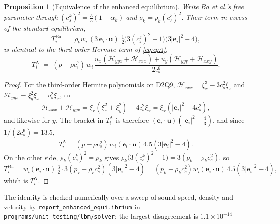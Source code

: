 \documentclass[11pt,a4paper]{article}
\theoremstyle{plain}
\newtheorem{proposition}{Proposition}
\theoremstyle{definition}
\newcommand{\ee}{\mathbf{e}}
\newcommand{\uu}{\mathbf{u}}
\newcommand{\cs}{c_s}
\begin{document}
\begin{proposition}[Equivalence of the enhanced equilibrium]
\label{prop:enhanced}
Write Ba et al.'s free parameter through
$(\cs^k)^2 = \tfrac{3}{5}(1-\alpha_k)$ and $p_k = \rho_k (\cs^k)^2$. Their term
in excess of the standard equilibrium,
\begin{equation}
  T^{\mathrm{Ba}}_i \;=\; \rho_k w_i \,(3\,\ee_i\!\cdot\!\uu)\;
  \tfrac12\bigl(3(\cs^k)^2 - 1\bigr)\bigl(3|\ee_i|^2 - 4\bigr),
\end{equation}
is identical to the third-order Hermite term of \eqref{eq:eqA},
\begin{equation}
  T^{\mathrm{A}}_i \;=\; (p - \rho\cs^2)\, w_i\,
  \frac{u_x(\mathcal{H}_{yyx} + \mathcal{H}_{xxx}) + u_y(\mathcal{H}_{yyy} + \mathcal{H}_{xxy})}{2\cs^6}.
\end{equation}
\end{proposition}

\begin{proof}
For the third-order Hermite polynomials on D2Q9,
$\mathcal{H}_{xxx} = \xi_x^3 - 3\cs^2 \xi_x$ and
$\mathcal{H}_{yyx} = \xi_y^2\xi_x - \cs^2\xi_x$, so
\begin{equation}
  \mathcal{H}_{xxx} + \mathcal{H}_{yyx}
   = \xi_x\left(\xi_x^2 + \xi_y^2\right) - 4\cs^2 \xi_x
   = \xi_x\left(|\ee_i|^2 - 4\cs^2\right),
\end{equation}
and likewise for $y$. The bracket in $T^{\mathrm{A}}_i$ is therefore
$(\ee_i\!\cdot\!\uu)(|\ee_i|^2 - \tfrac43)$, and since $1/(2\cs^6) = 13.5$,
\begin{equation}
  T^{\mathrm{A}}_i = (p - \rho\cs^2)\, w_i (\ee_i\!\cdot\!\uu)\,
  4.5\left(3|\ee_i|^2 - 4\right).
\end{equation}
On the other side, $\rho_k(\cs^k)^2 = p_k$ gives
$\rho_k\bigl(3(\cs^k)^2 - 1\bigr) = 3\left(p_k - \rho_k \cs^2\right)$, so
\begin{equation}
  T^{\mathrm{Ba}}_i = w_i (\ee_i\!\cdot\!\uu)\,\tfrac32 \cdot 3
  \left(p_k - \rho_k \cs^2\right)\left(3|\ee_i|^2 - 4\right)
  = \left(p_k - \rho_k\cs^2\right) w_i (\ee_i\!\cdot\!\uu)\, 4.5
  \left(3|\ee_i|^2 - 4\right),
\end{equation}
which is $T^{\mathrm{A}}_i$. \qedhere
\end{proof}

The identity is checked numerically over a sweep of sound speed, density and
velocity by \texttt{report\_enhanced\_equilibrium} in
\texttt{programs/unit\_testing/lbm/solver}; the largest disagreement is
$1.1 \times 10^{-14}$.
\end{document}
